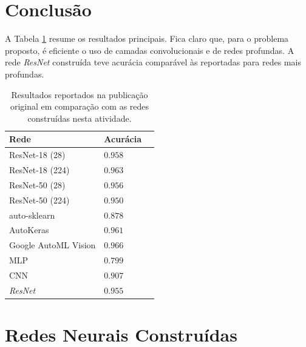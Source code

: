 \documentclass[final,5p]{elsarticle}
\numberwithin{equation}{section}
\begin{document}
    \section{Conclusão}

    A Tabela \ref{tab:resultados_resumo} resume os resultados principais. Fica claro que, para o problema proposto, é eficiente o uso de camadas convolucionais e de redes profundas. A rede \emph{ResNet} construída teve acurácia comparável às reportadas para redes mais profundas.

    \begin{table}[h]
        \centering
        \begin{tabular}{l l c}
            \toprule
            \textbf{Rede} & \textbf{Acurácia} \\
            \midrule
            ResNet-18 (28) & $0.958$ \\
            ResNet-18 (224) & $0.963$ \\
            ResNet-50 (28) & $0.956$ \\
            ResNet-50 (224) & $0.950$ \\
            auto-sklearn & $0.878$ \\
            AutoKeras & $0.961$ \\
            Google AutoML Vision & $0.966$ \\
            \midrule
            MLP & $0.799$ \\
            CNN & $0.907$ \\
            \emph{ResNet} & $0.955$ \\
            \bottomrule
        \end{tabular}
        \caption{Resultados reportados na publicação original \cite{medmnistv2} em comparação com as redes construídas nesta atividade.}
        \label{tab:resultados_resumo}
    \end{table}

\appendix

    \section{Redes Neurais Construídas}
\end{document}
